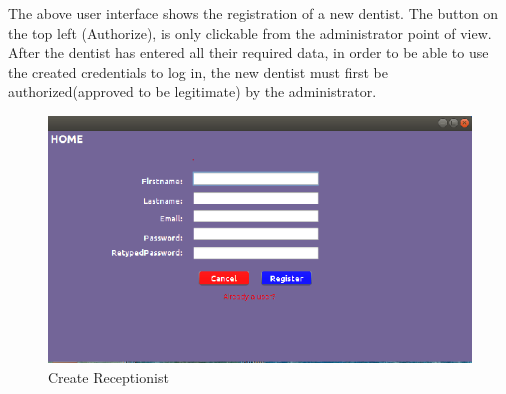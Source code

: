\documentclass[11 pt]{article}
\begin{document}
The above user interface shows the registration of a new dentist. The button on the top left (Authorize), is only clickable from the administrator point of view. After the dentist has entered all their required data, in order to be able to use the created credentials to log in, the new dentist must first be authorized(approved to be legitimate) by the administrator. 

\begin{figure}[h]
    \centering 
    \includegraphics[width=\linewidth]{new_receptionist.png}
    \caption{Create Receptionist}
    \label{fig:Create New Receptionist}
    \end{figure}
    \clearpage
\end{document}
